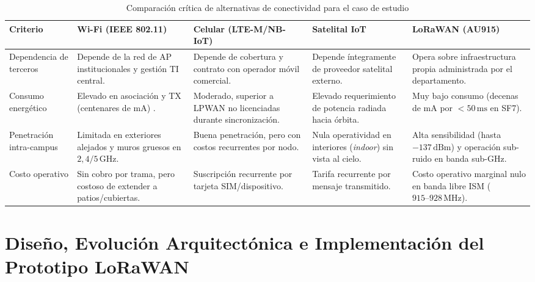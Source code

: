 \documentclass[12pt,oneside,openany,spanish,oldfontcommands]{memoir}
\begin{document}
\begin{table}[!htbp]
\centering
\caption{Comparación crítica de alternativas de conectividad para el caso de estudio}
\label{tab:alternativas}
\tiny
\begin{tabularx}{\textwidth}{
    >{\raggedright\arraybackslash}p{2.5cm}
    >{\raggedright\arraybackslash}X
    >{\raggedright\arraybackslash}X
    >{\raggedright\arraybackslash}X
    >{\raggedright\arraybackslash}X}
\toprule
\textbf{Criterio} &
\textbf{Wi-Fi (IEEE 802.11)} &
\textbf{Celular (LTE-M/NB-IoT)} &
\textbf{Satelital IoT} &
\textbf{LoRaWAN (AU915)}\\
\midrule
Dependencia de terceros &
Depende de la red de AP institucionales y gestión TI central. &
Depende de cobertura y contrato con operador móvil comercial. &
Depende íntegramente de proveedor satelital externo. &
Opera sobre infraestructura propia administrada por el departamento. \\
\midrule
Consumo energético &
Elevado en asociación y TX (centenares de mA) \parencite{callebaut2020}. &
Moderado, superior a LPWAN no licenciadas durante sincronización. &
Elevado requerimiento de potencia radiada hacia órbita. &
Muy bajo consumo (decenas de mA por $<50\,\text{ms}$ en SF7). \\
\midrule
Penetración intra-campus &
Limitada en exteriores alejados y muros gruesos en $2,4/5\,\text{GHz}$. &
Buena penetración, pero con costos recurrentes por nodo. &
Nula operatividad en interiores (\textit{indoor}) sin vista al cielo. &
Alta sensibilidad (hasta $-137\,\text{dBm}$) y operación sub-ruido en banda sub-GHz. \\
\midrule
Costo operativo &
Sin cobro por trama, pero costoso de extender a patios/cubiertas. &
Suscripción recurrente por tarjeta SIM/dispositivo. &
Tarifa recurrente por mensaje transmitido. &
Costo operativo marginal nulo en banda libre ISM ($915\text{--}928\,\text{MHz}$). \\
\bottomrule
\end{tabularx}
\end{table}

\chapter{Diseño, Evolución Arquitectónica e Implementación del Prototipo LoRaWAN}\label{cap:diseno-solucion}\label{cap:implementacion-etapa3}\label{cap:diseno-implementacion}
\end{document}
